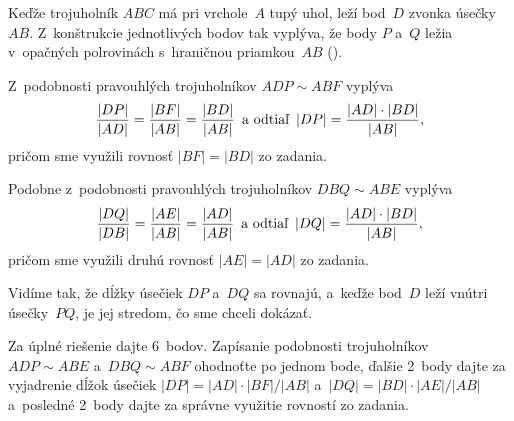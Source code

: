 {%
Keďže trojuholník $ABC$ má pri vrchole~$A$ tupý uhol, leží bod~$D$ zvonka
úsečky~$AB$. Z~konštrukcie jednotlivých bodov tak vyplýva, že
body $P$ a~$Q$ ležia v~opačných polrovinách s~hraničnou priamkou~$AB$ (\obr).
%

Z~podobnosti pravouhlých trojuholníkov $ADP\sim ABF$ vyplýva
$$
\frac {|DP|} {|AD|} = \frac {|BF|} {|AB|} = \frac {|BD|} {|AB|} \quad
\hbox {a~odtiaľ} \quad |DP| = \frac {|AD| \cdot |BD|} {|AB|},
$$
pričom sme využili rovnosť $|BF| = |BD|$ zo zadania.

Podobne z~podobnosti pravouhlých trojuholníkov $DBQ \sim ABE$ vyplýva
$$
\frac {|DQ|} {|DB|} = \frac {|AE|} {|AB|} = \frac {|AD|} {|AB|}
\quad\hbox {a~odtiaľ}\quad
|DQ| = \frac {|AD| \cdot |BD|} {|AB|},
$$
pričom sme využili druhú rovnosť $|AE| = |AD|$ zo zadania.

Vidíme tak, že dĺžky úsečiek $DP$ a~$DQ$ sa rovnajú, a~keďže
bod~$D$ leží vnútri úsečky~$PQ$, je jej stredom, čo sme
chceli dokázať.


\nobreak\medskip\petit\noindent
Za úplné riešenie dajte 6~bodov.
Zapísanie podobnosti trojuholníkov $ADP \sim ABE$ a~$DBQ \sim ABF$
ohodnoťte po jednom bode, ďalšie 2~body dajte za vyjadrenie dĺžok
úsečiek $|DP| = |AD| \cdot |BF| / |AB|$ a~$|DQ| = |BD| \cdot |AE| / |AB|$
a~posledné 2~body dajte za správne využitie rovností zo zadania.

\endpetit
}

